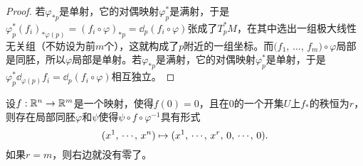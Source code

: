\begin{proof}
	若$\varphi_{*p}$是单射，它的对偶映射$\varphi^*_p$是满射，于是$\varphi^*_p(f_i)_{*\varphi(p)}=(f_i\circ\varphi)_{*p}=\dd_p(f_i\circ \varphi)$张成了$T_p^*M$，在其中选出一组极大线性无关组（不妨设为前$m$个），这就构成了$p$附近的一组坐标。而$(f_1$, $\dots$, $f_m)\circ \varphi$局部是同胚，所以$\varphi$局部是单射。若$\varphi_{*p}$是满射，它的对偶映射$\varphi^*_p$是单射，于是$\varphi^*_p\dd_{\varphi(p)}f_i=\dd_p(f_i\circ \varphi)$相互独立。
\end{proof}


\begin{thm}[秩定理]\label{rankthm}
设$f:\mathbb{R}^n\to\mathbb{R}^m$是一个映射，使得$f(0)=0$，且在$0$的一个开集$U$上$f_{*}$的秩恒为$r$，则存在局部同胚$\varphi$和$\psi$使得$\psi\circ f\circ \varphi^{-1}$具有形式
\[
	(x^1 ,\,\cdots\hspace{-0.05em},\,  x^n)\mapsto (x^1 ,\,\cdots\hspace{-0.05em},\, x^r,\,0 ,\,\cdots\hspace{-0.05em},\, 0).
\]
如果$r=m$，则右边就没有零了。
\end{thm}

